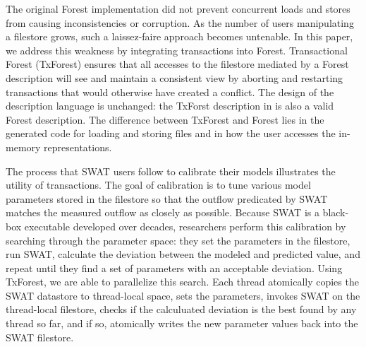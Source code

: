 
The original Forest implementation did not prevent concurrent loads
and stores from causing inconsistencies or corruption.  As the number
of users manipulating a filestore grows, such a laissez-faire approach
becomes untenable.  In this paper, we address this weakness by
integrating transactions into Forest.  Transactional Forest (TxForest)
ensures that all accesses to the filestore mediated by a Forest
description will see and maintain a consistent view by aborting and
restarting transactions that would otherwise have created a
conflict. The design of the description language is unchanged: the
TxForst description in  is also a valid
Forest description.  The difference between TxForest and Forest lies
in the generated code for loading and storing files and in how the
user accesses the in-memory representations.

The process that SWAT users follow to calibrate their models
illustrates the utility of transactions.  The goal of calibration is
to tune various model parameters stored in the filestore so that the
outflow predicated by SWAT matches the measured outflow as closely as
possible.  Because SWAT is a black-box executable developed over
decades, researchers perform this calibration by searching through the
parameter space: they set the parameters in the filestore, run SWAT,
calculate the deviation between the modeled and predicted value, and
repeat until they find a set of parameters with an acceptable
deviation.  Using TxForest, we are able to parallelize this search.
Each thread atomically copies the SWAT datastore to thread-local
space, sets the parameters, invokes SWAT on the thread-local
filestore, checks if the calculuated deviation is the best found by
any thread so far, and if so, atomically writes the new parameter
values back into the SWAT filestore.



